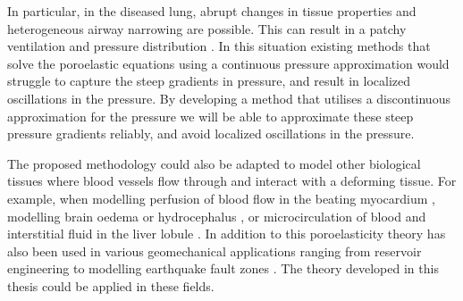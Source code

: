 In particular, in the diseased lung, abrupt changes in tissue properties and heterogeneous airway narrowing are possible. This can result in a patchy ventilation and pressure distribution \citep{venegas2005self}. In this situation existing methods that solve the poroelastic equations using a continuous pressure approximation would struggle to capture the steep gradients in pressure, and result in localized oscillations in the pressure. By developing a method that utilises a discontinuous approximation for the pressure we will be able to approximate these steep pressure gradients reliably, and avoid localized oscillations in the pressure.%

The proposed methodology could also be adapted to model other biological tissues where blood vessels flow through and interact with a deforming tissue. For example, when modelling perfusion of blood flow in the beating myocardium \citep{chapelle2010poroelastic,cookson2011novel}, modelling brain oedema \citep{li2010three} or hydrocephalus \citep{wirth2006axisymmetric}, or microcirculation of blood and interstitial fluid in the liver lobule \citep{leungchavaphongse2013mathematical}. In addition to this poroelasticity theory has also been used in various geomechanical applications ranging from reservoir engineering \citep{phillips2007coupling} to modelling earthquake fault zones \citep{white2008stabilized}. The theory developed in this thesis could be applied in these fields.


